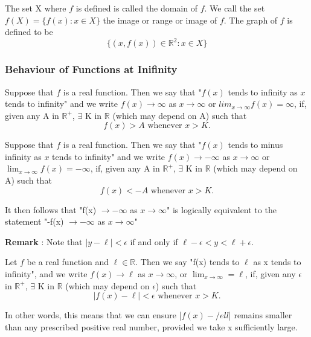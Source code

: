 \documentclass[12pt]{article}
\begin{document}
		\begin{defn}
			The set X where $f$ is defined is called the domain of $f$. We call the set $f(X) = \{f(x) : x \in X\}$ the 						image or range or image of $f$. The graph of $f$ is defined to be
							\[
							\{(x, f(x)) \in \mathbb{R}^2 : x \in X\}
							\]

		\end{defn}

		\subsubsection{Behaviour of Functions at Inifinity}
			\begin{defn}
				Suppose that $f$ is a real function. Then we say that "$f(x)$ tends to infinity as $x$ tends to 							infinity" and we write $f(x) \to \infty$ as $x \to \infty$ or $lim_{x \to \infty} f(x) = \infty$, 						if, given any A in $\mathbb{R}^+$, $\exists$ K in $\mathbb{R}$ (which may depend on A) 						such that
					\[
						f(x) > A \mbox{    whenever    } x > K.
					\]			

			\end{defn}

			\begin{defn}
				Suppose that $f$ is a real function. Then we say that "$f(x)$ tends to minus infinity as $x$ tends to 					infinity" and we write $f(x) \to -\infty$ as $x \to \infty$ or $\lim_{x \to \infty} f(x) = 							-\infty$, if, given any A in $\mathbb{R}^+$, $\exists$ K in $\mathbb{R}$ (which may 							depend on A) such that
					\[
						f(x) < -A \mbox{    whenever    } x > K.
					\]

				It then follows that "f(x) $\to -\infty$ as $x \to \infty$" is logically equivalent to the statement "-f(x) 					$\to -\infty$ as $x \to \infty$"
			\end{defn}

			{\bf{Remark}} : Note that $|y - \ell| < \epsilon$   if and only if   $\ell - \epsilon < y < \ell + \epsilon$.

			\begin{defn}
				Let $f$ be a real function and $\ell \in \mathbb{R}$. Then we say "f(x) tends to $\ell$ as x tends to 					infinity", and we write $f(x) \to \ell$ as $x \to \infty$, or $\lim_{x \to \infty} = \ell$, if, given any 					$\epsilon$ in $\mathbb{R}^+$, $\exists$ K in $\mathbb{R}$ (which may depend on $\epsilon$) such 					that
						\[
							|f(x) - \ell| < \epsilon \mbox{    whenever    } x > K.
						\]

				In other words, this means that we can ensure |$f(x) - /ell$| remains smaller than any prescribed 					positive real number, provided we take x sufficiently large.
			\end{defn}
\end{document}
